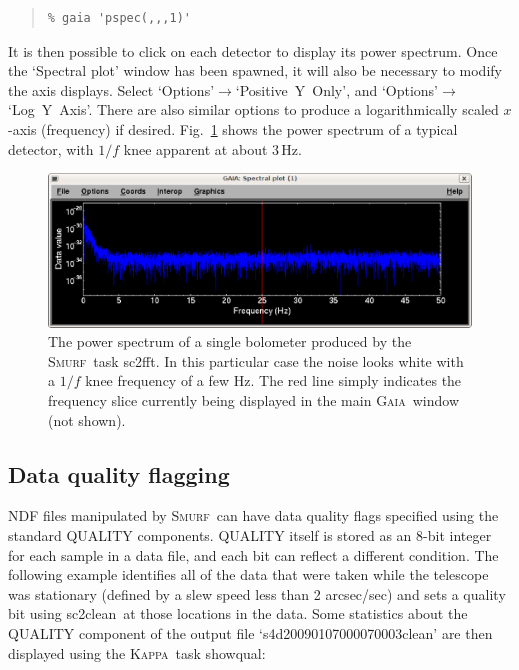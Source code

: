 \documentclass[twoside,11pt]{article}
\newenvironment{myquote}{\begin{quote}\begin{small}}{\end{small}\end{quote}}
\newcommand{\Kappa}{\xref{\textsc{Kappa}}{sun95}{}}
\newcommand{\gaia}{\xref{\textsc{Gaia}}{sun214}{}}
\newcommand{\smurf}{\xref{\textsc{Smurf}}{sun258}{}}
\newcommand{\task}[1]{\textsf{#1}}
\newcommand{\fft}{\xref{\task{sc2fft}}{sun258}{SC2FFT}}
\newcommand{\clean}{\xref{\task{sc2clean}}{sun258}{SC2CLEAN}}
\newcommand{\showqual}{\xref{\task{showqual}}{sun95}{SHOWQUAL}}
\newcommand{\xref}[3]{#1}
\newcommand{\xlabel}[1]{}
\renewcommand{\_}{\texttt{\symbol{95}}}
\begin{document}
\begin{myquote}
\begin{verbatim}
% gaia 'pspec(,,,1)'
\end{verbatim}
\end{myquote}

It is then possible to click on each detector to display its power
spectrum. Once the `Spectral plot' window has been spawned, it will
also be necessary to modify the axis displays. Select
`Options'$\rightarrow$`Positive~Y~Only', and
`Options'$\rightarrow$`Log~Y~Axis'.  There are also similar options to
produce a logarithmically scaled $x$-axis (frequency) if
desired. Fig.~\ref{fig:pspec} shows the power spectrum of a typical
detector, with $1/f$ knee apparent at about 3\,Hz.

\begin{figure}
\begin{center}
\includegraphics[width=\linewidth]{pspec}
\caption{The power spectrum of a single bolometer produced by the
  \smurf\ task \fft. In this particular case the noise looks white
  with a $1/f$ knee frequency of a few Hz. The red line simply
  indicates the frequency slice currently being displayed in the main
  \gaia\ window (not shown).}
\label{fig:pspec}
\end{center}
\end{figure}

\subsection{\xlabel{quality}Data quality flagging} 

NDF files manipulated by \smurf\ can have data quality flags specified
using the standard QUALITY components. QUALITY itself is stored as an
8-bit integer for each sample in a data file, and each bit can reflect
a different condition. The following example identifies all of the
data that were taken while the telescope was stationary (defined by a
slew speed less than 2 arcsec/sec) and sets a quality bit using
\clean\ at those locations in the data. Some statistics about the
QUALITY component of the output file `s4d20090107\_00007\_0003\_clean'
are then displayed using the \Kappa\ task \showqual:
\end{document}
